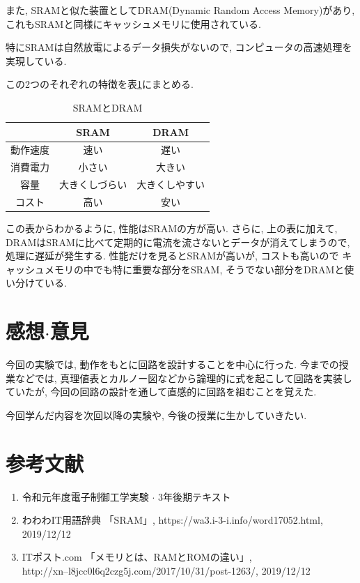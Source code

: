 \documentclass[titlepage]{jsarticle}
\begin{document}
  また, SRAMと似た装置としてDRAM(Dynamic Random Access Memory)があり,
  これもSRAMと同様にキャッシュメモリに使用されている.

  特にSRAMは自然放電によるデータ損失がないので,
  コンピュータの高速処理を実現している.

  この2つのそれぞれの特徴を表\ref{tab:SRAM_and_DRAM}にまとめる.

  \begin{table}[h]
    \centering
    \caption{SRAMとDRAM}
    \label{tab:SRAM_and_DRAM}
    \begin{tabular}{c|cc}
      & SRAM & DRAM \\ \hline
      動作速度 & 速い & 遅い \\
      消費電力 & 小さい & 大きい \\
      容量 & 大きくしづらい & 大きくしやすい \\
      コスト & 高い & 安い \\
    \end{tabular}
  \end{table}

  この表からわかるように, 性能はSRAMの方が高い.
  さらに, 上の表に加えて, DRAMはSRAMに比べて定期的に電流を流さないとデータが消えてしまうので,
  処理に遅延が発生する.
  性能だけを見るとSRAMが高いが, コストも高いので
  キャッシュメモリの中でも特に重要な部分をSRAM, そうでない部分をDRAMと使い分けている.
\section{感想$\cdot$意見}
  今回の実験では, 動作をもとに回路を設計することを中心に行った.
  今までの授業などでは, 真理値表とカルノー図などから論理的に式を起こして回路を実装していたが,
  今回の回路の設計を通して直感的に回路を組むことを覚えた.

  今回学んだ内容を次回以降の実験や, 今後の授業に生かしていきたい.
\section*{参考文献}
  \begin{enumerate}
    \item 令和元年度電子制御工学実験 $\cdot$ 3年後期テキスト
    \item わわわIT用語辞典 「SRAM」, https://wa3.i-3-i.info/word17052.html, 2019/12/12
    \item ITポスト.com 「メモリとは、RAMとROMの違い」,
      \\http://xn--l8jcc0l6q2czg5j.com/2017/10/31/post-1263/, 2019/12/12
  \end{enumerate}
\end{document}
